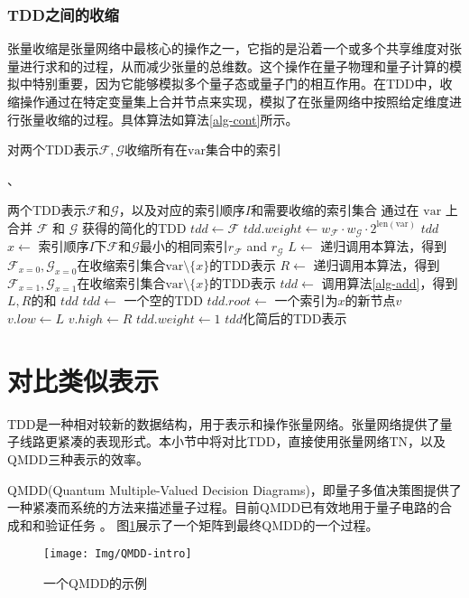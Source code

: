 \subsubsection*{TDD之间的收缩}
张量收缩是张量网络中最核心的操作之一，它指的是沿着一个或多个共享维度对张量进行求和的过程，从而减少张量的总维数。这个操作在量子物理和量子计算的模拟中特别重要，因为它能够模拟多个量子态或量子门的相互作用。在TDD中，收缩操作通过在特定变量集上合并节点来实现，模拟了在张量网络中按照给定维度进行张量收缩的过程。具体算法如算法\ref{alg-cont}所示。
\begin{algorithm}
\caption{对两个TDD表示\(\mathcal{F}, \mathcal{G}\)收缩所有在\(\text{var}\)集合中的索引}、
\label{alg-cont}
\begin{algorithmic}[1]
\Require 两个TDD表示\(\mathcal{F}\)和\(\mathcal{G}\)，以及对应的索引顺序\(I\)和需要收缩的索引集合
\Ensure 通过在 $\text{var}$ 上合并 \(\mathcal{F}\) 和 \(\mathcal{G}\) 获得的简化的TDD
    \State \(tdd \gets \mathcal{F}\)
    \State \(tdd.weight \gets w_{\mathcal{F}} \cdot w_{\mathcal{G}} \cdot 2^{\text{len}(\text{var})}\)
    \State \Return \(tdd\)
\EndIf
\State \(x \gets\) 索引顺序\(I\)下\(\mathcal{F}\)和\(\mathcal{G}\)最小的相同索引\(r_{\mathcal{F}}\) and \(r_{\mathcal{G}}\)
\State \(L \gets \) 递归调用本算法，得到\(\mathcal{F}_{x=0}, \mathcal{G}_{x=0}\)在收缩索引集合\(\text{var}\setminus\{x\}\)的TDD表示
\State \(R \gets \) 递归调用本算法，得到\(\mathcal{F}_{x=1}, \mathcal{G}_{x=1}\)在收缩索引集合\(\text{var}\setminus\{x\}\)的TDD表示
    \State \(tdd \gets\) 调用算法\ref{alg-add}，得到\(L, R\)的和
    \State \Return $tdd$
\Else
    \State \(tdd \gets\) 一个空的TDD
    \State \(tdd.root \gets\) 一个索引为\(x\)的新节点\(v\)
    \State \(v.low \gets L\)
    \State \(v.high \gets R\)
    \State \(tdd.weight \gets 1\)
    \State \Return \(tdd\)化简后的TDD表示
\EndIf
\end{algorithmic}
\end{algorithm}

\section{对比类似表示}
\label{sec-compare}
TDD是一种相对较新的数据结构，用于表示和操作张量网络。张量网络提供了量子线路更紧凑的表现形式。本小节中将对比TDD，直接使用张量网络TN，以及QMDD\citep{1623982}三种表示的效率。

QMDD(Quantum Multiple-Valued Decision Diagrams)，即量子多值决策图提供了一种紧凑而系统的方法来描述量子过程。目前QMDD已有效地用于量子电路的合成\citep{niemann2020advanced}和和验证任务
\citep{burgholzer2020verifying,burgholzer2020advanced}。
图\ref{fig:qmdd-basic}展示了一个矩阵到最终QMDD的一个过程。
\begin{figure}[htbp]
    \centering
    \texttt{[image: Img/QMDD-intro]}
    \caption{一个QMDD的示例}
    \label{fig:qmdd-basic}
\end{figure}

